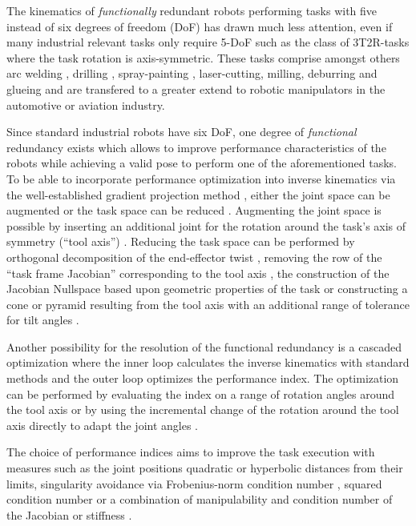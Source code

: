 \documentclass[twocolumn,10pt]{IFTOMM}
\begin{document}
The kinematics of \emph{functionally} redundant robots performing tasks with five instead of six degrees of freedom (DoF) has drawn much less attention, even if many industrial relevant tasks only require 5-DoF such as the class of 3T2R-tasks where the task rotation is axis-symmetric.
These tasks comprise amongst others arc welding \cite{HuoBar2005}, drilling \cite{ZhuQuCaoYan2013,GuoDonKe2015}, spray-painting \cite{FromGra2010}, laser-cutting, milling, deburring and glueing and are transfered to a greater extend to robotic manipulators in the automotive or aviation industry.

Since standard industrial robots have six DoF, one degree of \emph{functional} redundancy exists which allows to improve performance characteristics of the robots while achieving a valid pose to perform one of the aforementioned tasks.
To be able to incorporate performance optimization into inverse kinematics via the well-established gradient projection method \cite{Yoshikawa1984}, either the joint space can be augmented or the task space can be reduced \cite{Huo2009}.
Augmenting the joint space is possible by inserting an additional joint for the rotation around the task's axis of symmetry (``tool axis'') \cite{Baron2000}.
Reducing the task space can be performed by orthogonal decomposition of the end-effector twist \cite{HuoBar2005}, removing the row of the ``task frame Jacobian'' corresponding to the tool axis \cite{Zlajpah2017}, the construction of the Jacobian Nullspace based upon geometric properties of the task \cite{LegerAng2016} or constructing a cone or pyramid resulting from the tool axis with an additional range of tolerance for tilt angles \cite{FromGra2010}.

Another possibility for the resolution of the functional redundancy is a cascaded optimization where the inner loop calculates the inverse kinematics with standard methods and the outer loop optimizes the performance index.
The optimization can be performed by evaluating the index on a range of rotation angles around the tool axis \cite{ZhuQuCaoYan2013} or by using the incremental change of the rotation around the tool axis directly to adapt the joint angles  \cite{GuoDonKe2015}.

The choice of performance indices aims to improve the task execution with measures such as the joint positions quadratic \cite{HuoBar2005} or hyperbolic \cite{ZhuQuCaoYan2013} distances from their limits, singularity avoidance via Frobenius-norm condition number \cite{ZhuQuCaoYan2013}, squared condition number \cite{LegerAng2016} or a combination of manipulability and condition number of the Jacobian \cite{HuoBar2008} or stiffness \cite{GuoDonKe2015}.
\end{document}
